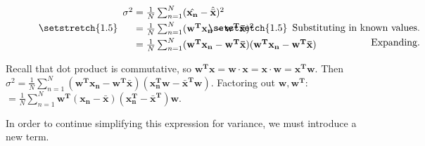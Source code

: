 \documentclass{article}
\begin{document}
\vspace{-3mm}
\[
\begin{minipage}{.5\linewidth}
  \centering
  $
  \setstretch{1.5}
  \begin{array}{l@{{}\mathrel{=}{}}l}
    \sigma^2 & \frac{1}{N} \sum_{n = 1}^{N}(\hat{\mathbf{x_n}} - \hat{\bar{\mathbf{x}}})^2 \\[\jot]
    &\frac{1}{N} \sum_{n=1}^{N}(\mathbf{w^{T}x_{n}} - \mathbf{w^{T}\bar{x}})^2 \\[\jot]
     &\frac{1}{N}\sum_{n=1}^{N}(\mathbf{w^{T}x_{n} - w^{T}\bar{x}})(\mathbf{w^{T}x_{n} - w^{T}\bar{x}})
  \end{array}$
\end{minipage}%
\begin{minipage}{.35\linewidth}
  \centering
  $
  \setstretch{1.5}
  \begin{array}{r}
    \\[\jot]
    \text{Substituting in known values.}\\[\jot]
    \text{Expanding.}
  \end{array}$
\end{minipage}
\]


\vspace{2mm}
\noindent Recall that dot product is commutative, so $\mathbf{w^{T}x} = \mathbf{w\cdot x} = \mathbf{x \cdot w} = \mathbf{x^{T}w}$.\newline
Then $\sigma^2 = \frac{1}{N}\sum_{n=1}^{N}(\mathbf{w^{T}x_{n} - w^{T}\bar{x}})(\mathbf{x^{T}_{n}w - \bar{x}^{T}w})$. Factoring out $\mathbf{w, w^T}$:\newline
$=\frac{1}{N}\sum_{n=1}^{N}\mathbf{w^T}(\mathbf{x_n - \bar{x}})(\mathbf{x_{n}^{T} - \bar{x}^T})\mathbf{w}$.

\vspace{2mm}
\noindent In order to continue simplifying this expression for variance, we must introduce a new term. 

\vspace{3mm}
\end{document}

